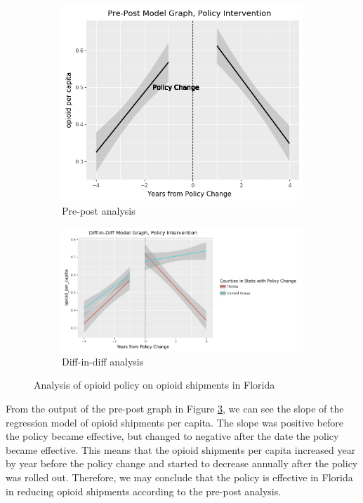 \documentclass[12pt,letterpaper]{article}
\begin{document}
\begin{figure}[!h]
\centering
\begin{subfigure}{.5\textwidth}
  \centering
  \includegraphics[width=.9\linewidth]{../30_results/General_Results/florida_opioid_shipment_prepost.png}
  \caption{Pre-post analysis}
  \label{fig:fl_ship_prepost}
\end{subfigure}%
\begin{subfigure}{.5\textwidth}
  \centering
  \includegraphics[width=.9\linewidth]{../30_results/General_Results/florida_opioid_shipment_diffdiff.png}
  \caption{Diff-in-diff analysis}
  \label{fig:fl_ship_did}
\end{subfigure}
\caption{Analysis of opioid policy on opioid shipments in Florida}
\label{fig:fl_ship}
\end{figure}

From the output of the pre-post graph in Figure \ref{fig:fl_ship}, we can see the slope of the regression model of opioid shipments per capita. The slope was positive before the policy became effective, but changed to negative after the date the policy became effective. This means that the opioid shipments per capita increased year by year before the policy change and started to decrease annually after the policy was rolled out. Therefore, we may conclude that the policy is effective in Florida in reducing opioid shipments according to the pre-post analysis.
\end{document}
